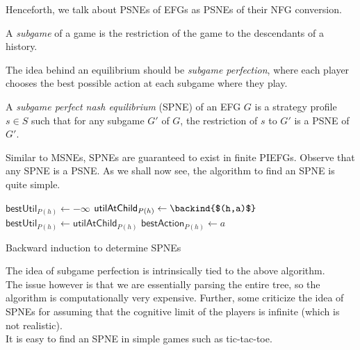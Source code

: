 	Henceforth, we talk about PSNEs of EFGs as PSNEs of their NFG conversion.

	\begin{fdef}
		A \emph{subgame} of a game is the restriction of the game to the descendants of a history.
	\end{fdef}

	The idea behind an equilibrium should be \emph{subgame perfection}, where each player chooses the best possible action at each subgame where they play.

	\begin{fdef}
		A \emph{subgame perfect nash equilibrium} (SPNE) of an EFG $G$ is a strategy profile $s \in S$ such that for any subgame $G'$ of $G$, the restriction of $s$ to $G'$ is a PSNE of $G'$.
	\end{fdef}

	Similar to MSNEs, SPNEs are guaranteed to exist in finite PIEFGs.
	Observe that any SPNE is a PSNE. As we shall now see, the algorithm to find an SPNE is quite simple.\\

	\begin{algorithm}[H]
		\DontPrintSemicolon
		\SetNoFillComment
		 { 
			 {
				\;
			}
			$\mathsf{bestUtil}_{P(h)} \gets -\infty$\;
			 {
				$\mathsf{utilAtChild}_{P(h)} \gets \backind{$(h,a)$}$\;
				 {
					$\mathsf{bestUtil}_{P(h)} \gets \mathsf{utilAtChild}_{P(h)}$\;
					$\mathsf{bestAction}_{P(h)} \gets a$\;
				}
			}
		}
		\caption{Backward induction to determine SPNEs}
	\end{algorithm}

	The idea of subgame perfection is intrinsically tied to the above algorithm.\\
	The issue however is that we are essentially parsing the entire tree, so the algorithm is computationally very expensive. Further, some criticize the idea of SPNEs for assuming that the cognitive limit of the players is infinite (which is not realistic).\\
	It is easy to find an SPNE in simple games such as tic-tac-toe.\\

